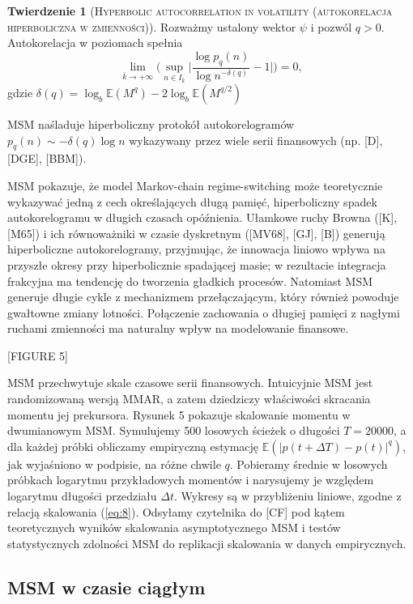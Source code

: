 \documentclass[12pt]{article}
\theoremstyle{definition}
\newtheorem{tw}{Twierdzenie}[section]
\begin{document}
\begin{tw}[\textsc{Hyperbolic autocorrelation in volatility (autokorelacja hiperboliczna w zmienności)}] Rozważmy ustalony wektor $\psi$ i pozwól $q> 0$. Autokorelacja w poziomach spełnia
$$ \lim_{\bar{k} \to + \infty} \Bigg(\sup_{n \in I_{\bar{k}}} \bigg|\frac{\log p_q(n)}{\log n^{-\delta(q)}}-1 \bigg| \Bigg) = 0, $$
gdzie $\delta(q) = \log_b \mathbb{E}(M^q) - 2 \log_b \mathbb{E}(M^{q/2})$
\end{tw}

MSM naśladuje hiperboliczny protokół autokorelogramów $p_q(n) \sim -\delta(q) \log n$ wykazywany przez wiele serii finansowych (np. [D], [DGE], [BBM]).

MSM pokazuje, że model Markov-chain regime-switching może teoretycznie wykazywać jedną z cech określających długą pamięć, hiperboliczny spadek autokorelogramu w długich czasach opóźnienia. Ułamkowe ruchy Browna ([K], [M65]) i ich równoważniki w czasie dyskretnym ([MV68], [GJ], [B]) generują hiperboliczne autokorelogramy, przyjmując, że innowacja liniowo wpływa na przyszłe okresy przy hiperbolicznie spadającej masie; w rezultacie integracja frakcyjna ma tendencję do tworzenia gładkich procesów. Natomiast MSM generuje długie cykle z mechanizmem przełączającym, który również powoduje gwałtowne zmiany lotności. Połączenie zachowania o długiej pamięci z nagłymi ruchami zmienności ma naturalny wpływ na modelowanie finansowe.

\begin{center}
[FIGURE 5]
\end{center}

MSM przechwytuje skale czasowe serii finansowych. Intuicyjnie MSM jest randomizowaną wersją MMAR, a zatem dziedziczy właściwości skracania momentu jej prekursora. Rysunek 5 pokazuje skalowanie momentu w dwumianowym MSM. Symulujemy 500 losowych ścieżek o długości $T = 20 000$, a dla każdej próbki obliczamy empiryczną estymację $\mathbb{E}(|p(t+\Delta T)-p(t)|^q)$, jak wyjaśniono w podpisie, na różne chwile $q$. Pobieramy średnie w losowych próbkach logarytmu przykładowych momentów i narysujemy je względem logarytmu długości przedziału $\Delta t$. Wykresy są w przybliżeniu liniowe, zgodne z relacją skalowania (\ref{eq:8}). Odsyłamy czytelnika do [CF] pod kątem teoretycznych wyników skalowania asymptotycznego MSM i testów statystycznych zdolności MSM do replikacji skalowania w danych empirycznych.

\subsection{MSM w czasie ciągłym}
\end{document}
